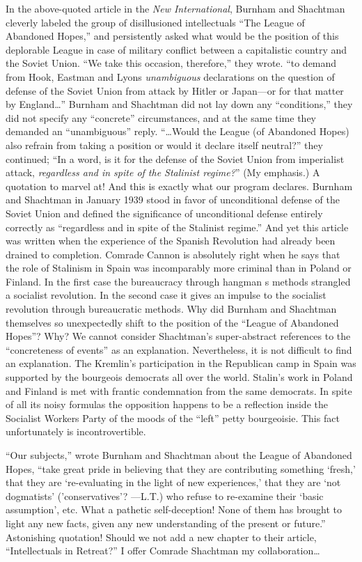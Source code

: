 In the above-quoted article in the \emph{New International}, Burnham and Shachtman cleverly labeled the group of disillusioned intellectuals “The League of Abandoned Hopes,” and persistently asked what would be the position of this deplorable League in case of military conflict between a capitalistic country and the Soviet Union. “We take this occasion, therefore,” they wrote. “to demand from Hook, Eastman and Lyons \emph{unambiguous} declarations on the question of defense of the Soviet Union from attack by Hitler or Japan---or for that matter by England\dots” Burnham and Shachtman did not lay down any “conditions,” they did not specify any “concrete” circumstances, and at the same time they demanded an “unambiguous” reply. “\dots Would the League (of Abandoned Hopes) also refrain from taking a position or would it declare itself neutral?” they continued; “In a word, is it for the defense of the Soviet Union from imperialist attack, \emph{regardless and in spite of the Stalinist regime?}” (My emphasis.) A quotation to marvel at! And this is exactly what our program declares. Burnham and Shachtman in January 1939 stood in favor of unconditional defense of the Soviet Union and defined the significance of unconditional defense entirely correctly as “regardless and in spite of the Stalinist regime.” And yet this article was written when the experience of the Spanish Revolution had already been drained to completion. Comrade Cannon is absolutely right when he says that the role of Stalinism in Spain was incomparably more criminal than in Poland or Finland. In the first case the bureaucracy through hangman s methods strangled a socialist revolution. In the second case it gives an impulse to the socialist revolution through bureaucratic methods. Why did Burnham and Shachtman themselves so unexpectedly shift to the position of the “League of Abandoned Hopes”? Why? We cannot consider Shachtman’s super-abstract references to the “concreteness of events” as an explanation. Nevertheless, it is not difficult to find an explanation. The Kremlin’s participation in the Republican camp in Spain was supported by the bourgeois democrats all over the world. Stalin’s work in Poland and Finland is met with frantic condemnation from the same democrats. In spite of all its noisy formulas the opposition happens to be a reflection inside the Socialist Workers Party of the moods of the “left” petty bourgeoisie. This fact unfortunately is incontrovertible.

“Our subjects,” wrote Burnham and Shachtman about the League of Abandoned Hopes, “take great pride in believing that they are contributing something ‘fresh,’ that they are ‘re-evaluating in the light of new experiences,’ that they are ‘not dogmatists’ (’conservatives’? ---L.T.) who refuse to re-examine their ‘basic assumption’, etc. What a pathetic self-deception! None of them has brought to light any new facts, given any new understanding of the present or future.” Astonishing quotation! Should we not add a new chapter to their article, ``Intellectuals in Retreat?'' I offer Comrade Shachtman my collaboration\dots

